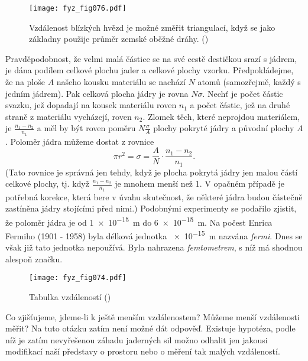 {    \begin{figure}[ht!]  %
      \centering
      \texttt{[image: fyz\_fig076.pdf]}
      \caption{Vzdálenost blízkých hvězd je možné změřit triangulací, když se jako základny použije 
               průměr zemské oběžné dráhy. (\cite[s.~71]{Feynman01})}
      \label{fyz:fig076}
    \end{figure}   
    Pravděpodobnost, že velmi malá částice se na své cestě destičkou srazí s jádrem, je dána 
    podílem celkové plochu jader a celkové plochy vzorku. Předpokládejme, že na ploše \(A\) našeho 
    kousku materiálu se nachází \(N\) atomů (samozřejmě, každý s jedním jádrem). Pak celková plocha 
     jádry je rovna \(N\sigma\). Nechť je počet částic svazku, jež dopadají na kousek 
    materiálu roven \(n_1\) a počet částic, jež na druhé straně z materiálu vycházejí, roven 
    \(n_2\). Zlomek těch, které neprojdou materiálem, je \(\frac{n_1-n_2}{n_1}\) a měl by být roven 
    poměru \(N\frac{\sigma}{A}\) plochy pokryté jádry a původní plochy \(A\). Poloměr jádra můžeme 
    dostat z rovnice
    \begin{equation}\label{FYZ:eq066}
      \pi r^2 = \sigma = \frac{A}{N}\cdot\frac{n_1-n_2}{n_1}.
    \end{equation}
    (Tato rovnice je správná jen tehdy, když je plocha pokrytá jádry jen malou částí celkové 
    plochy, tj. když \(\frac{n_1-n_2}{n_1}\) je mnohem menší než \num{1}. V opačném případě je 
    potřebná korekce, která bere v úvahu skutečnost, že některé jádra budou částečně zastíněna 
    jádry stojícími před nimi.) Podobnými experimenty se podařilo zjistit, že poloměr jádra je od 
    \SI{1e-15}{\m} do \SI{6e-15}{\m}. Na počest Enrica Fermiho (1901 - 1958) byla délková jednotka 
    \SI{e-15}{\m} nazvána \emph{fermi}. Dnes se však již tato jednotka nepoužívá. Byla nahrazena 
    \emph{femtometrem}, s níž má shodnou alespoň značku.
    
    \begin{figure}[ht!]  %
      \centering
      \texttt{[image: fyz\_fig074.pdf]}
      \caption{Tabulka vzdáleností (\cite[s.~75]{Feynman01})}
      \label{fyz:fig074}
    \end{figure}
    
    Co zjišťujeme, jdeme-li k ještě menším vzdálenostem? Můžeme menší vzdálenosti měřit? Na tuto 
    otázku zatím není možné dát odpověď. Existuje hypotéza, podle níž je zatím nevyřešenou záhadu 
    jaderných sil možno odhalit jen jakousi modifikací naší představy o prostoru nebo o měření tak 
    malých vzdáleností.
    
}
